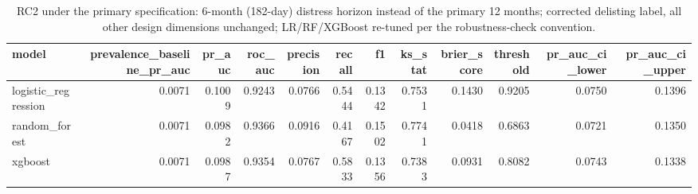 \begin{table}[htbp]
\centering
\caption{RC2 under the primary specification: 6-month (182-day) distress horizon instead of the primary 12 months; corrected delisting label, all other design dimensions unchanged; LR/RF/XGBoost re-tuned per the robustness-check convention.}
\label{tab:v2_rc2}
\small
\begin{tabular}{lrrrrrrrrrrr}
\toprule
model & prevalence\_baseline\_pr\_auc & pr\_auc & roc\_auc & precision & recall & f1 & ks\_stat & brier\_score & threshold & pr\_auc\_ci\_lower & pr\_auc\_ci\_upper \\
\midrule
logistic\_regression & 0.0071 & 0.1009 & 0.9243 & 0.0766 & 0.5444 & 0.1342 & 0.7531 & 0.1430 & 0.9205 & 0.0750 & 0.1396 \\
random\_forest & 0.0071 & 0.0982 & 0.9366 & 0.0916 & 0.4167 & 0.1502 & 0.7741 & 0.0418 & 0.6863 & 0.0721 & 0.1350 \\
xgboost & 0.0071 & 0.0987 & 0.9354 & 0.0767 & 0.5833 & 0.1356 & 0.7383 & 0.0931 & 0.8082 & 0.0743 & 0.1338 \\
\bottomrule
\end{tabular}
\end{table}
